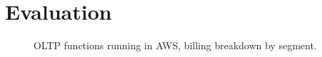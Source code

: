 \chapter{Evaluation}

\begin{figure}
    \begin{center}
        
    \end{center}
    \caption{OLTP \faaasc{} functions running in AWS, billing breakdown by segment.}
\end{figure}
